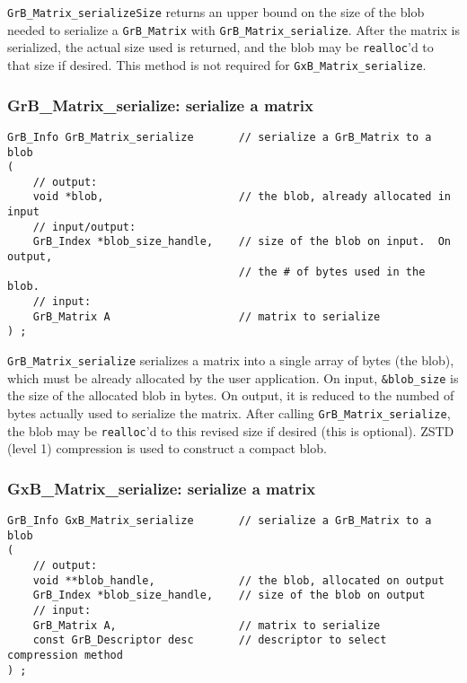 \documentclass[12pt]{article}
\begin{document}
\verb'GrB_Matrix_serializeSize' returns an upper bound on the size of the blob
needed to serialize a \verb'GrB_Matrix' with \verb'GrB_Matrix_serialize'.
After the matrix is serialized, the actual size used is returned, and the blob
may be \verb'realloc''d to that size if desired.
This method is not required for \verb'GxB_Matrix_serialize'.

\newpage
\subsubsection{{\sf GrB\_Matrix\_serialize:}      serialize a matrix}
\label{matrix_serialize}

\begin{mdframed}[userdefinedwidth=6in]
{\footnotesize
\begin{verbatim}
GrB_Info GrB_Matrix_serialize       // serialize a GrB_Matrix to a blob
(
    // output:
    void *blob,                     // the blob, already allocated in input
    // input/output:
    GrB_Index *blob_size_handle,    // size of the blob on input.  On output,
                                    // the # of bytes used in the blob.
    // input:
    GrB_Matrix A                    // matrix to serialize
) ;
\end{verbatim}
} \end{mdframed}

\verb'GrB_Matrix_serialize' serializes a matrix into a single array of bytes
(the blob), which must be already allocated by the user application.
On input, \verb'&blob_size' is the size of the allocated blob in bytes.
On output, it is reduced to the numbed of bytes actually used to serialize
the matrix.  After calling \verb'GrB_Matrix_serialize', the blob may be
\verb'realloc''d to this revised size if desired (this is optional).
ZSTD (level 1) compression is used to construct a compact blob.

\subsubsection{{\sf GxB\_Matrix\_serialize:}      serialize a matrix}
\label{matrix_serialize_GxB}

\begin{mdframed}[userdefinedwidth=6in]
{\footnotesize
\begin{verbatim}
GrB_Info GxB_Matrix_serialize       // serialize a GrB_Matrix to a blob
(
    // output:
    void **blob_handle,             // the blob, allocated on output
    GrB_Index *blob_size_handle,    // size of the blob on output
    // input:
    GrB_Matrix A,                   // matrix to serialize
    const GrB_Descriptor desc       // descriptor to select compression method
) ;
\end{verbatim}
} \end{mdframed}
\end{document}
